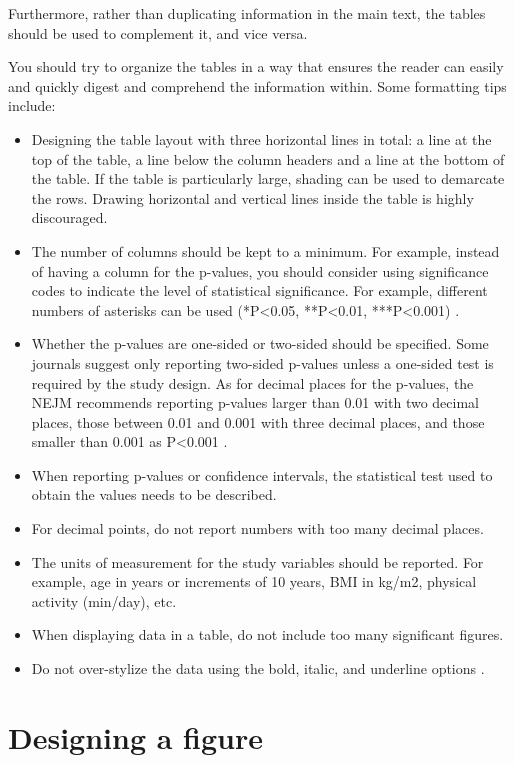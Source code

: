 \documentclass[
]{book}
\providecommand{\tightlist}{%
  \setlength{\itemsep}{0pt}\setlength{\parskip}{0pt}}
\begin{document}
Furthermore, rather than duplicating information in the main text, the tables should be used to complement it, and vice versa.

You should try to organize the tables in a way that ensures the reader can easily and quickly digest and comprehend the information within. Some formatting tips include:

\begin{itemize}
\tightlist
\item
  Designing the table layout with three horizontal lines in total: a line at the top of the table, a line below the column headers and a line at the bottom of the table. If the table is particularly large, shading can be used to demarcate the rows. Drawing horizontal and vertical lines inside the table is highly discouraged.
\item
  The number of columns should be kept to a minimum. For example, instead of having a column for the p-values, you should consider using significance codes to indicate the level of statistical significance. For example, different numbers of asterisks can be used (*P\textless0.05, **P\textless0.01, ***P\textless0.001) \citep{kotz2013effective4}.
\item
  Whether the p-values are one-sided or two-sided should be specified. Some journals suggest only reporting two-sided p-values unless a one-sided test is required by the study design. As for decimal places for the p-values, the NEJM recommends reporting p-values larger than 0.01 with two decimal places, those between 0.01 and 0.001 with three decimal places, and those smaller than 0.001 as P\textless0.001 \citep{nejm2021author}.
\item
  When reporting p-values or confidence intervals, the statistical test used to obtain the values needs to be described.
\item
  For decimal points, do not report numbers with too many decimal places.
\item
  The units of measurement for the study variables should be reported. For example, age in years or increments of 10 years, BMI in kg/m2, physical activity (min/day), etc.
\item
  When displaying data in a table, do not include too many significant figures.
\item
  Do not over-stylize the data using the bold, italic, and underline options \citep{franzblau2012graphs}.
\end{itemize}

\hypertarget{designing-a-figure}{%
\section{Designing a figure}\label{designing-a-figure}}
\end{document}
